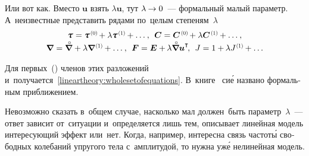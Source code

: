 \begin{otherlanguage}{russian}
Или вот как. Вместо $\bm{u}$ взять $\lambda \bm{u}$, тут ${\lambda \hspace{-0.1ex}\to 0}$~--- формальный малый параметр. А~неизвестные представить рядами по~целым степеням~$\lambda$
\vspace{0.1em}\[\begin{array}{c}
\mathboldtau \hspace{0.1ex} = \mathboldtau^{\hspace{0.2ex}\scalebox{0.66}[0.66]{(0)}} \hspace{-0.2ex} + \lambda \mathboldtau^{\hspace{0.2ex}\scalebox{0.66}[0.66]{(1)}} \hspace{-0.1ex} + \ldots \hspace{0.1ex}, \:\:
\bm{C} = \bm{C}^{\hspace{0.2ex}\scalebox{0.66}[0.66]{(0)}} \hspace{-0.2ex} + \lambda \bm{C}^{\hspace{0.2ex}\scalebox{0.66}[0.66]{(1)}} \hspace{-0.1ex} + \ldots \hspace{0.1ex}, \\[0.1em]
\boldnabla \hspace{0.1ex} = \boldnablacircled \hspace{0.1ex} + \lambda \boldnabla^{\hspace{0.2ex}\scalebox{0.66}[0.66]{(1)}} \hspace{-0.1ex} + \ldots \hspace{0.1ex} , \:\:
\bm{F} = \bm{E} + \hspace{-0.1ex} \lambda \boldnablacircled {\bm{u}}^{\T} \hspace{-0.3ex}, \:\:
J = 1 + \hspace{-0.1ex} \lambda J^{\hspace{0.1ex}\scalebox{0.66}[0.66]{(1)}} \hspace{-0.1ex} + \ldots
\end{array}\]

\noindent Для первых~() членов этих разложений и~получается~\eqref{lineartheory:wholesetofequations}. В~\hbox{книге~\cite{truesdell-firstcourse}} си\'{е} названо формальным приближением.

Невозможно сказать в~общем случае, насколько мал должен~быть параметр~$\lambda$~--- ответ зависит от~ситуации и~определяется лишь тем, описывает линейная модель интересующий эффект или~нет. Когда, например, интересна связь частот\'{ы} свободных колебаний упругого тела с~амплитудой, то нужна уж\'{е} нелинейная модель.


\end{otherlanguage}
